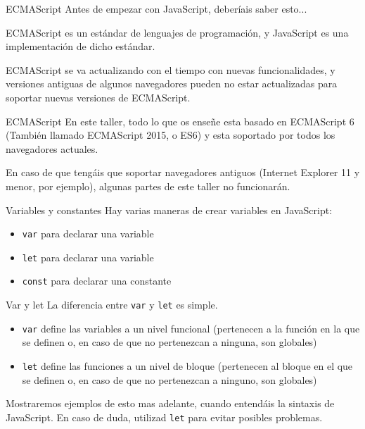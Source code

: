 \documentclass{beamer}
\begin{document}
\begin{frame}{ECMAScript}
Antes de empezar con JavaScript, deberíais saber esto...

ECMAScript es un estándar de lenguajes de programación, y JavaScript es una implementación de dicho estándar.

ECMAScript se va actualizando con el tiempo con nuevas funcionalidades, y versiones antiguas de algunos navegadores pueden no estar actualizadas para soportar nuevas versiones de ECMAScript.
\end{frame}

\begin{frame}{ECMAScript}
En este taller, todo lo que os enseñe esta basado en ECMAScript 6 (También llamado ECMAScript 2015, o ES6) y esta soportado por todos los navegadores actuales.

En caso de que tengáis que soportar navegadores antiguos (Internet Explorer 11 y menor, por ejemplo), algunas partes de este taller no funcionarán.
\end{frame}

\begin{frame}[fragile]{Variables y constantes}
Hay varias maneras de crear variables en JavaScript:
\begin{itemize}
    \item {\verb|var|} para declarar una variable 
    \item {\verb|let|} para declarar una variable
    \item {\verb|const|} para declarar una constante
\end{itemize}

\end{frame}

\begin{frame}[fragile]{Var y let}
La diferencia entre {\verb|var|} y {\verb|let|} es simple.
\begin{itemize}
    \item {\verb|var|} define las variables a un nivel funcional (pertenecen a la función en la que se definen o, en caso de que no pertenezcan a ninguna, son globales)
    
    \item {\verb|let|} define las funciones a un nivel de bloque (pertenecen al bloque en el que se definen o, en caso de que no pertenezcan a ninguno, son globales)
\end{itemize}

Mostraremos ejemplos de esto mas adelante, cuando entendáis la sintaxis de JavaScript. En caso de duda, utilizad {\verb|let|} para evitar posibles problemas.
\end{frame}
\end{document}
